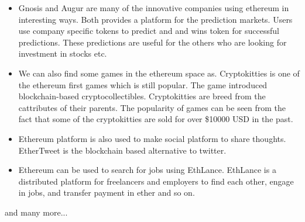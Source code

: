 \begin{itemize}
    \item Gnosis\cite{gnosis} and Augur\cite{augur} are many of the innovative companies using ethereum in interesting ways. Both provides a platform for the prediction markets. Users use company specific tokens to predict and and wins token for successful predictions. These predictions are useful for the others who are looking for investment in stocks etc.
    \item We can also find some games in the ethereum space as. Cryptokitties\cite{cryptokitties} is one of the ethereum first games which is still popular. The game introduced blockchain-based cryptocollectibles. Cryptokitties are breed from the cattributes of their parents. The popularity of games can be seen from the fact that some of the cryptokitties are sold for over \$10000 USD in the past.
    \item  Ethereum platform is also used to make social platform to share thoughts. EtherTweet\cite{ethertweet} is the blockchain based alternative to twitter.
    \item Ethereum can be used to search for jobs using EthLance\cite{ethlance}. EthLance is a distributed platform for freelancers and employers to find each other, engage in jobs, and transfer payment in ether and so on.
\end{itemize}
and many more...\\

